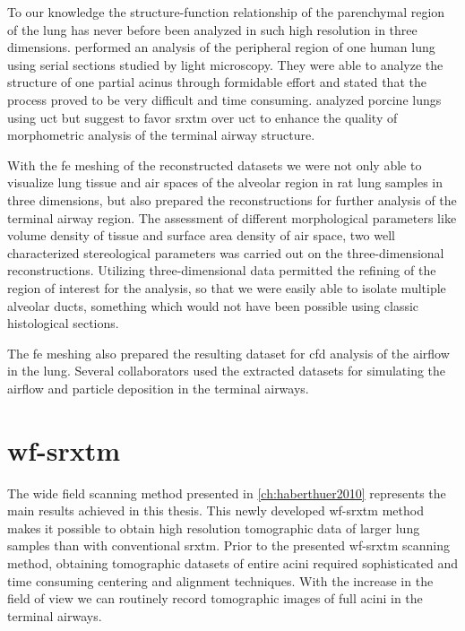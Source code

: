To our knowledge the structure-function relationship of the parenchymal region of the lung has never before been analyzed in such high resolution in three dimensions. \citet{Berend1991} performed an analysis of the peripheral region of one human lung using serial sections studied by light microscopy. They were able to analyze the structure of one partial acinus through formidable effort and stated that the process proved to be very difficult and time consuming. \citet{Litzlbauer2006} analyzed porcine lungs using \ac{uct} but suggest to favor \ac{srxtm} over \ac{uct} to enhance the quality of morphometric analysis of the terminal airway structure.

With the \ac{fe} meshing of the reconstructed datasets we were not only able to visualize lung tissue and air spaces of the alveolar region in rat lung samples in three dimensions, but also prepared the reconstructions for further analysis of the terminal airway region. The assessment of different morphological parameters like volume density of tissue and surface area density of air space, two well characterized stereological parameters was carried out on the three-dimensional reconstructions. Utilizing three-dimensional data permitted the refining of the region of interest for the analysis, so that we were easily able to isolate multiple alveolar ducts, something which would not have been possible using classic histological sections.

The \ac{fe} meshing also prepared the resulting dataset for \ac{cfd} analysis of the airflow in the lung. Several collaborators used the extracted datasets for simulating the airflow \cite{Sznitman2007,Sznitman2009} and particle deposition \cite{Filipovic2010} in the terminal airways.

\section[\acs{wf-srxtm}]{\acl{wf-srxtm}}
The wide field scanning method presented in \autoref{ch:haberthuer2010} represents the main results achieved in this thesis. This newly developed \ac{wf-srxtm} method makes it possible to obtain high resolution tomographic data of larger lung samples than with conventional \ac{srxtm}. Prior to the presented \ac{wf-srxtm} scanning method, obtaining tomographic datasets of entire acini required sophisticated and time consuming centering and alignment techniques. With the increase in the field of view we can routinely record tomographic images of full acini in the terminal airways.

